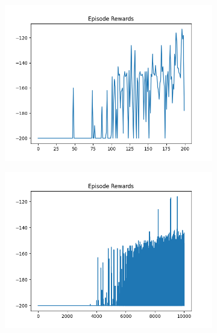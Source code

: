 \begin{figure}[H]
\begin{subfigure}{.47\linewidth}
        \includegraphics[width=\textwidth]{mountain/2024-06-15_16-46-16_dqn_mountaincar_episode_rewards.png}
    \end{subfigure}
    \begin{subfigure}{.47\linewidth}
        \centering
        \includegraphics[width=\textwidth]{mountain/2024-06-15_12-16-56_dqn_mountaincar_episode_rewards.png}
    \end{subfigure}
\end{figure}
